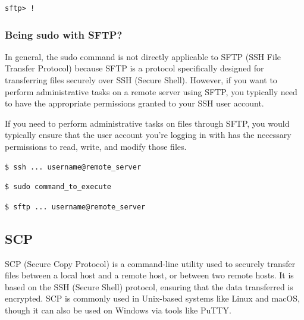 \documentclass{article}
\newenvironment{codetemplate}[1][]{%
  \mybasecolorbox[#1]
  \itshape
}{%
  \endmybasecolorbox
}
\begin{document}
\begin{codetemplate}{}
\begin{verbatim}
sftp> !
\end{verbatim}
\end{codetemplate}

\subsubsection{Being sudo with SFTP?}
In general, the sudo command is not directly applicable to SFTP (SSH File Transfer Protocol) because SFTP is a protocol specifically designed for transferring files securely over SSH (Secure Shell). However, if you want to perform administrative tasks on a remote server using SFTP, you typically need to have the appropriate permissions granted to your SSH user account.

If you need to perform administrative tasks on files through SFTP, you would typically ensure that the user account you're logging in with has the necessary permissions to read, write, and modify those files. 

\begin{codetemplate}{}
\begin{verbatim}
$ ssh ... username@remote_server
\end{verbatim}
\end{codetemplate}

\begin{codetemplate}{}
\begin{verbatim}
$ sudo command_to_execute
\end{verbatim}
\end{codetemplate}

\begin{codetemplate}{}
\begin{verbatim}
$ sftp ... username@remote_server
\end{verbatim}
\end{codetemplate}

\subsection{SCP}
SCP (Secure Copy Protocol) is a command-line utility used to securely transfer files between a local host and a remote host, or between two remote hosts. It is based on the SSH (Secure Shell) protocol, ensuring that the data transferred is encrypted. SCP is commonly used in Unix-based systems like Linux and macOS, though it can also be used on Windows via tools like PuTTY.
\end{document}

